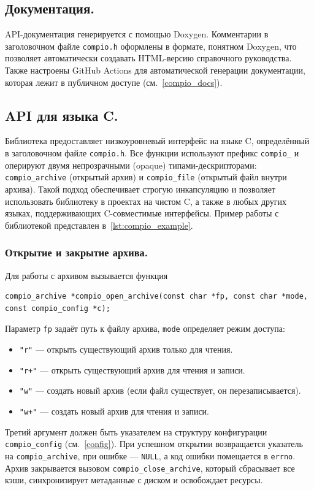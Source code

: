 \subsection{Документация.}

API-документация генерируется с помощью Doxygen. Комментарии в заголовочном файле \texttt{compio.h} оформлены в формате, понятном Doxygen, что позволяет автоматически создавать HTML-версию справочного руководства. Также настроены GitHub Actions для автоматической генерации документации, которая лежит в публичном доступе (см.~\ref{compio_docs}).

\subsection{API для языка C.}

Библиотека предоставляет низкоуровневый интерфейс на языке C, определённый в заголовочном файле \texttt{compio.h}. Все функции используют префикс \texttt{compio\_} и оперируют двумя непрозрачными (opaque) типами-дескрипторами: \texttt{compio\_archive} (открытый архив) и \texttt{compio\_file} (открытый файл внутри архива). Такой подход обеспечивает строгую инкапсуляцию и позволяет использовать библиотеку в проектах на чистом C, а также в любых других языках, поддерживающих C-совместимые интерфейсы. Пример работы с библиотекой представлен в~\ref{lst:compio_example}.

\subsubsection{Открытие и закрытие архива.}
Для работы с архивом вызывается функция
\begin{lstlisting}
compio_archive *compio_open_archive(const char *fp, const char *mode, const compio_config *c);
\end{lstlisting}
Параметр \texttt{fp} задаёт путь к файлу архива, \texttt{mode} определяет режим доступа:
\begin{itemize}
    \item \texttt{"r"} --- открыть существующий архив только для чтения.
    \item \texttt{"r+"} --- открыть существующий архив для чтения и записи.
    \item \texttt{"w"} --- создать новый архив (если файл существует, он перезаписывается).
    \item \texttt{"w+"} --- создать новый архив для чтения и записи.
\end{itemize}
Третий аргумент должен быть указателем на структуру конфигурации \texttt{compio\_config} (см.~\ref{config}). При успешном открытии возвращается указатель на \texttt{compio\_archive}, при ошибке --- \texttt{NULL}, а код ошибки помещается в \texttt{errno}. Архив закрывается вызовом \texttt{compio\_close\_archive}, который сбрасывает все кэши, синхронизирует метаданные с диском и освобождает ресурсы.

